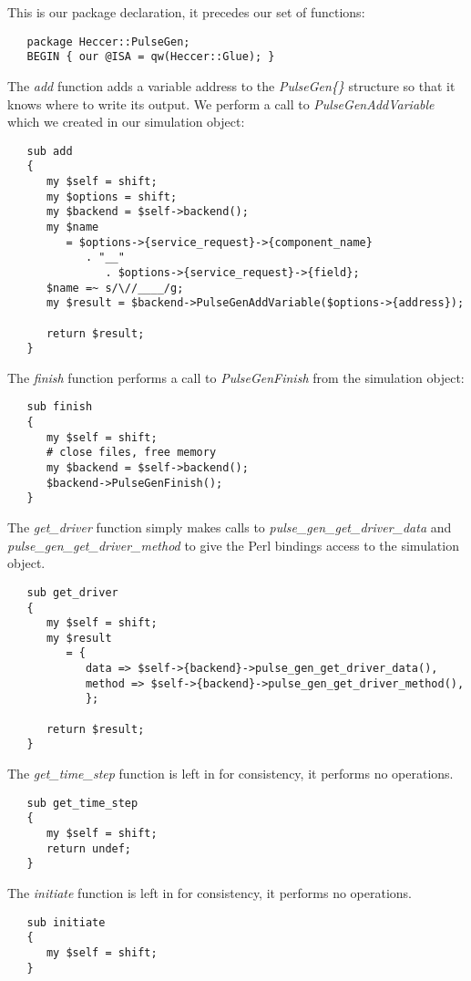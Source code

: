\documentclass[12pt]{article}
\begin{document}
This is our package declaration, it precedes our set of functions:
\begin{verbatim}
   package Heccer::PulseGen;
   BEGIN { our @ISA = qw(Heccer::Glue); }
\end{verbatim}
The {\it add} function adds a variable address to the {\it PulseGen\{\}} structure so that it knows where to write its output. We perform a call to {\it PulseGenAddVariable} which we created in our simulation object:
\begin{verbatim}
   sub add
   {
      my $self = shift;
      my $options = shift;
      my $backend = $self->backend();
      my $name
         = $options->{service_request}->{component_name}
            . "__"
               . $options->{service_request}->{field};
      $name =~ s/\//____/g;
      my $result = $backend->PulseGenAddVariable($options->{address});

      return $result;
   }
\end{verbatim}
The {\it finish} function performs a call to {\it PulseGenFinish} from the simulation object:
\begin{verbatim}
   sub finish
   {
      my $self = shift;
      # close files, free memory
      my $backend = $self->backend();
      $backend->PulseGenFinish();
   }
\end{verbatim}
The {\it get\_driver} function simply makes calls to {\it pulse\_gen\_get\_driver\_data} and {\it pulse\_gen\_get\_driver\_method} to give the Perl bindings access to the simulation object.
\begin{verbatim}
   sub get_driver
   {
      my $self = shift;
      my $result
         = {
            data => $self->{backend}->pulse_gen_get_driver_data(),
            method => $self->{backend}->pulse_gen_get_driver_method(),
            };

      return $result;
   }
\end{verbatim}
The {\it get\_time\_step} function is left in for consistency, it performs no operations.
\begin{verbatim}
   sub get_time_step
   {
      my $self = shift;
      return undef;
   }
\end{verbatim}
The {\it initiate} function is left in for consistency, it performs no operations.
\begin{verbatim}
   sub initiate
   {
      my $self = shift;
   }
\end{verbatim}
\end{document}
